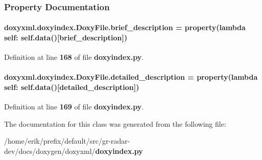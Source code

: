 \subsubsection{Property Documentation}
\paragraph[{brief\+\_\+description}]{\setlength{\rightskip}{0pt plus 5cm}doxyxml.\+doxyindex.\+Doxy\+File.\+brief\+\_\+description = {\bf property}(lambda self\+: {\bf self.\+data}()[\textquotesingle{}brief\+\_\+description\textquotesingle{}])\hspace{0.3cm}{\ttfamily [static]}}\label{classdoxyxml_1_1doxyindex_1_1DoxyFile_a1dbefdbae0f75a8759d4ced1dffc6a6b}


Definition at line {\bf 168} of file {\bf doxyindex.\+py}.

\paragraph[{detailed\+\_\+description}]{\setlength{\rightskip}{0pt plus 5cm}doxyxml.\+doxyindex.\+Doxy\+File.\+detailed\+\_\+description = {\bf property}(lambda self\+: {\bf self.\+data}()[\textquotesingle{}detailed\+\_\+description\textquotesingle{}])\hspace{0.3cm}{\ttfamily [static]}}\label{classdoxyxml_1_1doxyindex_1_1DoxyFile_ace3ea9fea2d4d29b49be7edf276beae4}


Definition at line {\bf 169} of file {\bf doxyindex.\+py}.



The documentation for this class was generated from the following file\+:\begin{DoxyCompactItemize}
\item 
/home/erik/prefix/default/src/gr-\/radar-\/dev/docs/doxygen/doxyxml/{\bf doxyindex.\+py}\end{DoxyCompactItemize}
